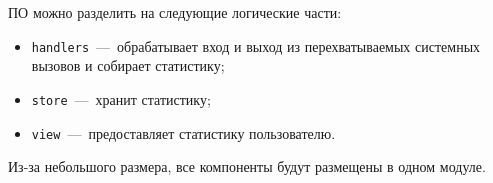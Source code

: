 ПО можно разделить на следующие логические части:

\begin{itemize}
	\item \texttt{handlers}~---~обрабатывает вход и выход из перехватываемых системных вызовов и собирает статистику;
	\item \texttt{store}~---~хранит статистику;
	\item \texttt{view}~---~предоставляет статистику пользователю.
\end{itemize}

Из-за небольшого размера, все компоненты будут размещены в одном модуле.


